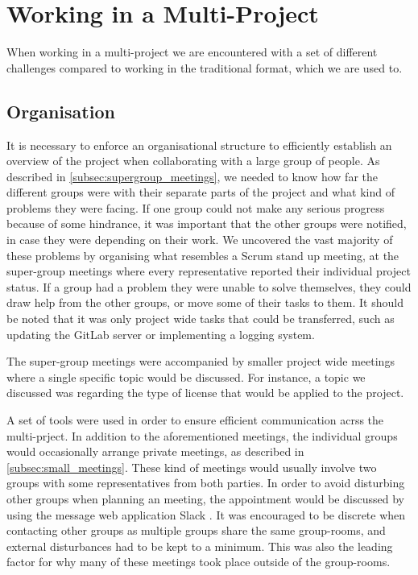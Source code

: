 \section{Working in a Multi-Project}
When working in a multi-project we are encountered with a set of different challenges compared to working in the traditional format, which we are used to.

\subsection{Organisation}
It is necessary to enforce an organisational structure to efficiently establish an overview of the project when collaborating with a large group of people. As described in \cref{subsec:supergroup_meetings}, we needed to know how far the different groups were with their separate parts of the project and what kind of problems they were facing. If one group could not make any serious progress because of some hindrance, it was important that the other groups were notified, in case they were depending on their work. We uncovered the vast majority of these problems by organising what resembles a Scrum stand up meeting, at the super-group meetings where every representative reported their individual project status. If a group had a problem they were unable to solve themselves, they could draw help from the other groups, or move some of their tasks to them. It should be noted that it was only project wide tasks that could be transferred, such as updating the GitLab server or implementing a logging system.

The super-group meetings were accompanied by smaller project wide meetings where a single specific topic would be discussed. For instance, a topic we discussed was regarding the type of license that would be applied to the project.

A set of tools were used in order to ensure efficient communication acrss the multi-prject. In addition to the aforementioned meetings, the individual groups would occasionally arrange private meetings, as described in \cref{subsec:small_meetings}. These kind of meetings would usually involve two groups with some representatives from both parties. In order to avoid disturbing other groups when planning an meeting, the appointment would be discussed by using the message web application Slack \cite{slack}. It was encouraged to be discrete when contacting other groups as multiple groups share the same group-rooms, and external disturbances had to be kept to a minimum. This was also the leading factor for why many of these meetings took place outside of the group-rooms.

